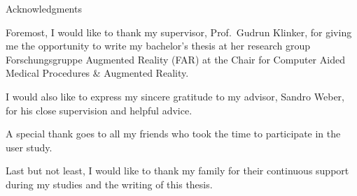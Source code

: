 \clearpage
{}
\thispagestyle{empty}

\vspace*{20mm}

\begin{center}
	{ Acknowledgments}
\end{center}

\vspace{10mm}

Foremost, I would like to thank my supervisor, Prof.\ Gudrun Klinker, for giving me the opportunity to write my bachelor's thesis at her research group Forschungsgruppe Augmented Reality (FAR) at the Chair for Computer Aided Medical Procedures \& Augmented Reality.

I would also like to express my sincere gratitude to my advisor, Sandro Weber, for his close supervision and helpful advice.

A special thank goes to all my friends who took the time to participate in the user study.

Last but not least, I would like to thank my family for their continuous support during my studies and the writing of this thesis.

\cleardoublepage{}

